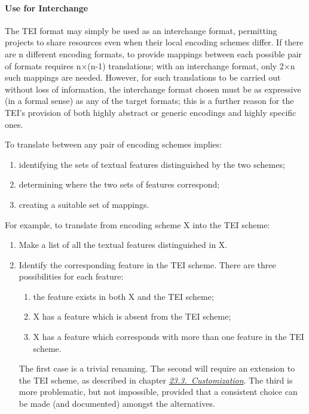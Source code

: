 \paragraph[{Use for Interchange}]{Use for Interchange}\label{ABAPP2}\par
The TEI format may simply be used as an interchange format, permitting projects to share resources even when their local encoding schemes differ. If there are n different encoding formats, to provide mappings between each possible pair of formats requires n×(n-1) translations; with an interchange format, only 2×n such mappings are needed. However, for such translations to be carried out without loss of information, the interchange format chosen must be as expressive (in a formal sense) as any of the target formats; this is a further reason for the TEI's provision of both highly abstract or generic encodings and highly specific ones.\par
To translate between any pair of encoding schemes implies: \begin{enumerate}
\item identifying the sets of textual features distinguished by the two schemes;
\item determining where the two sets of features correspond;
\item creating a suitable set of mappings.
\end{enumerate}\par
For example, to translate from encoding scheme X into the TEI scheme: \begin{enumerate}
\item Make a list of all the textual features distinguished in X. 
\item Identify the corresponding feature in the TEI scheme. There are three possibilities for each feature: \mbox{}\\[-10pt] \begin{enumerate}
\item the feature exists in both X and the TEI scheme;
\item X has a feature which is absent from the TEI scheme;
\item X has a feature which corresponds with more than one feature in the TEI scheme.
\end{enumerate} The first case is a trivial renaming. The second will require an extension to the TEI scheme, as described in chapter \textit{\hyperref[MD]{23.3.\ Customization}}. The third is more problematic, but not impossible, provided that a consistent choice can be made (and documented) amongst the alternatives.
\end{enumerate}\par

